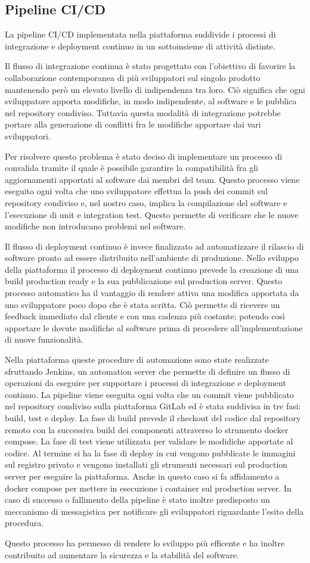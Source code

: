 \subsection{Pipeline CI/CD}
La pipeline CI/CD implementata nella piattaforma suddivide i processi di integrazione e deployment continuo
in un sottoinsieme di attività distinte.

Il flusso di integrazione continua è stato progettato con l'obiettivo di favorire la collaborazione
contemporanea di più sviluppatori sul singolo prodotto mantenendo però un elevato livello di indipendenza
tra loro. Ciò significa che ogni sviluppatore apporta modifiche, in modo indipendente, al software
e le pubblica nel repository condiviso. Tuttavia questa modalità di integrazione
potrebbe portare alla generazione di conflitti fra le modifiche apportare dai vari sviluppatori.

Per risolvere questo problema è stato deciso di implementare un processo di convalida
tramite il quale è possibile garantire la compatibilità fra gli aggiornamenti apportati al software dai membri
del team.
Questo processo viene eseguito ogni volta che uno sviluppatore effettua la push dei commit sul repository
condiviso e, nel nostro caso, implica la compilazione del software e l'esecuzione  di unit e integration test.
Questo permette di verificare che le nuove modifiche non introducano problemi nel software.

Il flusso di deployment continuo è invece finalizzato ad automatizzare il rilascio di software pronto ad essere
distribuito nell'ambiente di produzione.
Nello sviluppo della piattaforma il processo di deployment continuo prevede la creazione di una build production ready
e la sua pubblicazione sul production server. Questo processo automatico ha il vantaggio di rendere
attiva una modifica apportata da uno sviluppatore poco dopo che è stata scritta. Ciò permette di ricevere un
feedback immediato dal cliente e con una cadenza più costante; potendo così apportare
le dovute modifiche al software prima di procedere all'implementazione di nuove funzionalità.

Nella piattaforma queste procedure di automazione sono state realizzate sfruttando Jenkins, un automation server
che permette di definire un flusso di operazioni da eseguire per supportare i processi di integrazione e deployment continuo.
La pipeline viene eseguita ogni volta che un commit viene pubblicato nel repository condiviso sulla piattaforma GitLab ed
è stata suddivisa in tre fasi: build, test e deploy.
La fase di build prevede il checkout del codice dal repository remoto con la successiva build dei componenti attraverso lo strumento docker compose.
La fase di test viene utilizzata per validare le modidiche apportate al codice. Al termine si ha la fase di deploy in cui vengono pubblicate
le immagini sul registro privato e vengono installati gli strumenti necessari sul production server per eseguire la piattaforma. Anche in questo caso si fa
affidamento a docker compose per mettere in esecuzione i container sul production server.
In caso di successo o fallimento della pipeline è stato inoltre predisposto un meccanismo di messagistica per notificare
gli sviluppatori riguardante l'esito della procedura.

Questo processo ha permesso di rendere lo sviluppo più efficente e ha inoltre contribuito ad aumentare
la sicurezza e la stabilità del software.